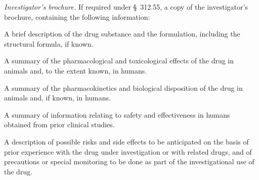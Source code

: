 \documentclass[11pt]{article}
\begin{document}
\begin{description}[leftmargin=0.5cm,style=sameline]
\item[(5)] \textit{Investigator's brochure.} If required under \S~312.55, a copy of the investigator's brochure, containing the following information:
\begin{description}[leftmargin=0.8cm,style=sameline]
\item[(i)] A brief description of the drug substance and the formulation, including the structural formula, if known.
\item[(ii)] A summary of the pharmacological and toxicological effects of the drug in animals and, to the extent known, in humans.
\item[(iii)] A summary of the pharmacokinetics and biological disposition of the drug in animals and, if known, in humans.
\item[(iv)] A summary of information relating to safety and effectiveness in humans obtained from prior clinical studies.
\item[(v)] A description of possible risks and side effects to be anticipated on the basis of prior experience with the drug under investigation or with related drugs, and of precautions or special monitoring to be done as part of the investigational use of the drug.
\end{description}


\end{description}
\end{document}

